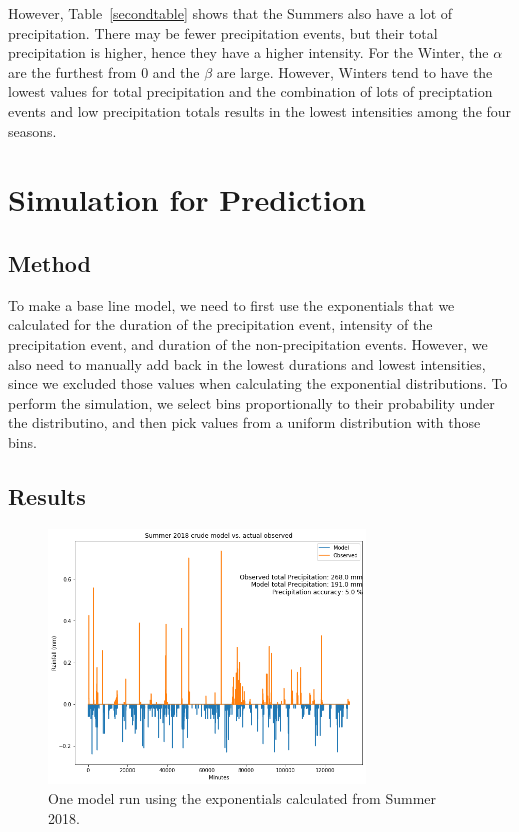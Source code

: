 \documentclass[11pt]{report}
\begin{document}
However, Table~\ref{secondtable} shows that the Summers also have a lot of
precipitation. There may be fewer precipitation events, but their total
precipitation is higher, hence they have a higher intensity.  For the
Winter, the $\alpha$ are the furthest from 0 and the $\beta$ are
large. However, Winters tend to have the lowest values for total
precipitation and the combination of lots of preciptation events and low
precipitation totals results in the lowest intensities among the four
seasons.


\clearpage

\section{Simulation for Prediction}\label{sec:sfp}

\subsection{Method}\label{sec:sfp_m}

To make a base line model, we need to first use the exponentials that we
calculated for the duration of the precipitation event, intensity of the
precipitation event, and duration of the non-precipitation events. However,
we also need to manually add back in the lowest durations and lowest
intensities, since we excluded those values when calculating the exponential
distributions. To perform the simulation, we select bins proportionally to
their probability under the distributino, and then pick values from a
uniform distribution with those bins.

\clearpage 

\subsection{Results}\label{sec:sfp_r}

\begin{figure}[t]
  \centering
  \includegraphics[width=0.75\textwidth]{Figures/better_one_run.png}
  \caption[One run using Summer 2018 climatology] {\label{crudemodel}One
    model run using the exponentials calculated from Summer 2018.}
\end{figure}
\end{document}
